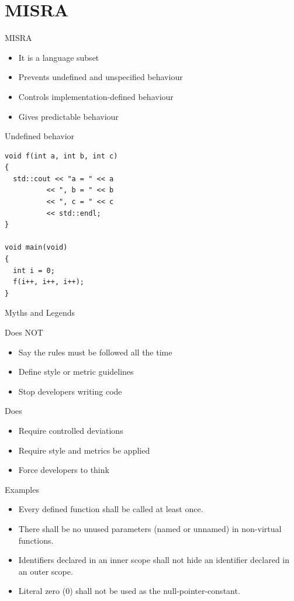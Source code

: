\documentclass{beamer}
\begin{document}
\section{MISRA}
\begin{frame}{MISRA}
\begin{itemize}
  \item It is a language subset
  \item Prevents undefined and unspecified behaviour
  \item Controls implementation-defined behaviour
  \item Gives predictable behaviour
\end{itemize}
\end{frame}

\begin{frame}[fragile]{Undefined behavior}
\begin{lstlisting}
void f(int a, int b, int c)
{ 
  std::cout << "a = " << a 
          << ", b = " << b 
          << ", c = " << c 
          << std::endl; 
}

void main(void)
{
  int i = 0;  
  f(i++, i++, i++); 
}
\end{lstlisting}
\end{frame}

\begin{frame}{Myths and Legends}
\begin{block}{Does NOT}
\begin{itemize}
  \item Say the rules must be followed all the time
  \item Define style or metric guidelines
  \item Stop developers writing code
\end{itemize}
\end{block}
\begin{block}{Does}
\begin{itemize}
  \item Require controlled deviations
  \item Require style and metrics be applied
  \item Force developers to think
\end{itemize}
\end{block}
\end{frame}


\begin{frame}{Examples}
\begin{itemize}
  \item Every defined function shall be called at least once.
  \item There shall be no unused parameters (named or unnamed) in non-virtual
  functions.
  \item Identifiers declared in an inner scope shall not hide an identifier
  declared in an outer scope.
  \item Literal zero (0) shall not be used as the null-pointer-constant.
\end{itemize}
\end{frame}
\end{document}
